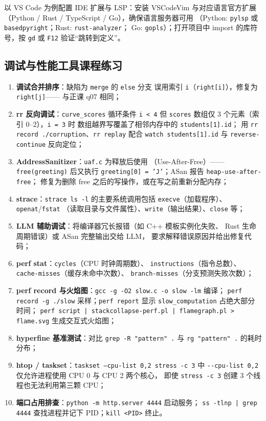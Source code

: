 \documentclass[a4paper,11pt]{ctexart}
\begin{document}
以 VS Code 为例配置 IDE 扩展与 LSP：安装 VSCodeVim 与对应语言官方扩展
（Python / Rust / TypeScript / Go），确保语言服务器可用
（Python: \texttt{pylsp} 或 \texttt{basedpyright}；Rust: \texttt{rust-analyzer}；
Go: \texttt{gopls}）；打开项目中 import 的库符号，按 \texttt{gd} 或 \texttt{F12}
验证``跳转到定义''。

\subsection{调试与性能工具课程练习}

\begin{enumerate}
  \item \textbf{调试合并排序}：缺陷为 \texttt{merge} 的 \texttt{else} 分支
        误用索引 \texttt{i}（\texttt{right[i]}），修复为 \texttt{right[j]}——
        与正课 q07 相同；
  \item \textbf{rr 反向调试}：\texttt{curve\_scores} 循环条件 \texttt{i < 4}
        但 \texttt{scores} 数组仅 3 个元素（索引 0--2），\texttt{i = 3} 时
        数组越界写覆盖了相邻内存中的 \texttt{students[1].id}；
        用 \texttt{rr record ./corruption}、\texttt{rr replay} 配合
        \texttt{watch students[1].id} 与 \texttt{reverse-continue} 反向定位；
  \item \textbf{AddressSanitizer}：\texttt{uaf.c} 为释放后使用
        （Use-After-Free）——\texttt{free(greeting)} 后又执行
        \texttt{greeting[0] = 'J'}；ASan 报告 \texttt{heap-use-after-free}；
        修复为删除 free 之后的写操作，或在写之前重新分配内存；
  \item \textbf{strace}：\texttt{strace ls -l} 的主要系统调用包括
        \texttt{execve}（加载程序）、\texttt{openat}/\texttt{fstat}
        （读取目录与文件属性）、\texttt{write}（输出结果）、\texttt{close} 等；
  \item \textbf{LLM 辅助调试}：将编译器冗长报错（如 C++ 模板实例化失败、
        Rust 生命周期错误）或 ASan 完整输出交给 LLM，
        要求解释错误原因并给出修复代码；
  \item \textbf{perf stat}：\texttt{cycles}（CPU 时钟周期数）、
        \texttt{instructions}（指令总数）、\texttt{cache-misses}（缓存未命中次数）、
        \texttt{branch-misses}（分支预测失败次数）；
  \item \textbf{perf record 与火焰图}：\texttt{gcc -g -O2 slow.c -o slow -lm} 编译；
        \texttt{perf record -g ./slow} 采样；\texttt{perf report} 显示
        \texttt{slow\_computation} 占绝大部分时间；
        \texttt{perf script | stackcollapse-perf.pl | flamegraph.pl > flame.svg}
        生成交互式火焰图；
  \item \textbf{hyperfine 基准测试}：对比 \texttt{grep -R "pattern" .} 与
        \texttt{rg "pattern" .} 的耗时分布；
  \item \textbf{htop / taskset}：\texttt{taskset --cpu-list 0,2 stress -c 3}
        中 \texttt{-{}-cpu-list 0,2} 仅允许进程使用 CPU 0 与 CPU 2 两个核心，
        即使 \texttt{stress -c 3} 创建 3 个线程也无法利用第三颗 CPU；
  \item \textbf{端口占用排查}：\texttt{python -m http.server 4444} 启动服务；
        \texttt{ss -tlnp | grep 4444} 查找进程并记下 PID；\texttt{kill <PID>} 终止。
\end{enumerate}
\end{document}
